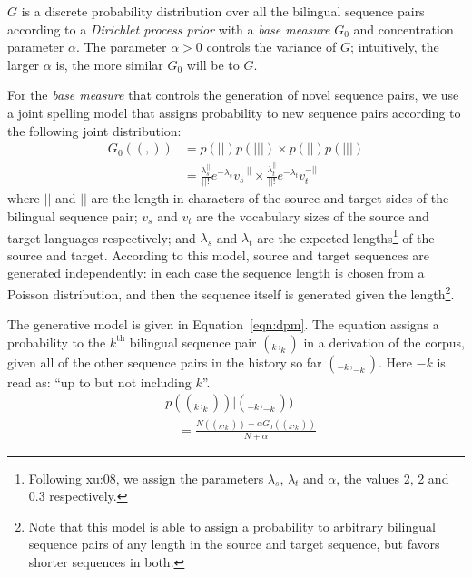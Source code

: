\documentclass[english]{jnlp_1.4}
\newcommand{\phrase}[1]{}
\renewcommand{\shortcite}{}
\begin{document}
 $G$ is a discrete probability distribution over all the bilingual sequence pairs according to
 a {\em Dirichlet process prior} with a {\em base measure} $G_0$ and concentration parameter $\alpha$.
 The parameter $\alpha > 0$ controls the variance of $G$;
 intuitively, the larger $\alpha$ is, the more similar $G_0$ will be to $G$.

 For the {\em base measure} that controls the generation of novel sequence pairs,
 we use a joint spelling model that assigns probability to new sequence pairs
 according to the following joint distribution:
\begin{align}
   G_0((\phrase{s}, \phrase{t})) & = p(|\phrase{s}|)p(\phrase{s}||\phrase{s}|) \times p(|\phrase{t}|)p(\phrase{t}||\phrase{t}|) \nonumber \\
	& = \frac{{\lambda}_{s}^{|\phrase{s}|}}{|\phrase{s}|!} e^{-{\lambda}_{s}}v_{s}^{-|\phrase{s}|} 
	\times \frac{{\lambda}_{t}^{|\phrase{t}|}}{|\phrase{t}|!} e^{-{\lambda}_{t}}v_{t}^{-|\phrase{t}|}
\end{align}
 where $|\phrase{s}|$ and $|\phrase{t}|$ are the length in characters of the source and target sides of the bilingual
 sequence pair; $v_{s}$ and $v_{t}$ are the vocabulary sizes of the source and target languages respectively;
 and $\lambda_{s}$ and $\lambda_{t}$ are the expected 
lengths\footnote{Following \shortcite{xu:08}, we assign the parameters $\lambda_{s}$, $\lambda_{t}$ and $\alpha$, the values 2, 2 and 0.3 respectively.}
 of the source and target.
 According to this model, source and target sequences are generated independently: in each case the sequence length is
 chosen from a Poisson distribution, and then the sequence itself is generated given the length\footnote{Note that this model is able to assign a probability to arbitrary bilingual sequence pairs of any length in the source and target sequence, but favors shorter sequences in both.}.

 The generative model is given in Equation~\ref{eqn:dpm}. The equation assigns a probability to the $k^\mathrm{th}$ bilingual
 sequence pair $(\phrase{s}_k, \phrase{t}_k)$ in a derivation of the corpus, given all of the other sequence pairs in the history so far
 $(\phrase{s}_{-k}, \phrase{t}_{-k})$. Here $-k$ is read as: ``up to but not including $k$''.
\begin{align}
   & p((\phrase{s}_k, \phrase{t}_k)) | (\phrase{s}_{-k}, \phrase{t}_{-k})) \nonumber \\
   & \quad = \frac{N( (\phrase{s}_k, \phrase{t}_k) ) + \alpha G_0( (\phrase{s}_k, \phrase{t}_k) )}{N + \alpha}
   \label{eqn:dpm}
\end{align}
\end{document}
